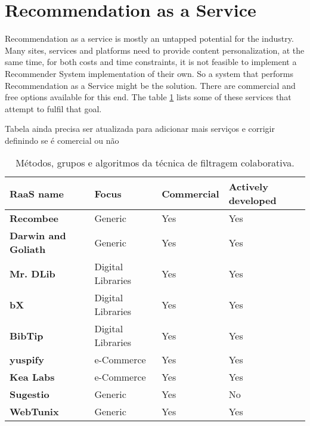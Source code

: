 \section{Recommendation as a Service}


Recommendation as a service is mostly an untapped potential for the industry. Many sites, services and platforms need to provide content personalization, at the same time, for both costs and time constraints, it is not feasible to implement a Recommender System implementation of their own. So a system that performs Recommendation as a Service might be the solution. There are commercial and free options available for this end.  The table \ref{tab:cf_methods} lists some of these services that attempt to fulfil that goal.  


Tabela ainda precisa ser atualizada para adicionar mais serviços e corrigir definindo se é comercial ou não

\begin{table}[hbt!]
\begin{tabular}{|l|l|l|l|}
\hline
\textbf{RaaS name}                             & \textbf{Focus}     & \textbf{Commercial}             & \textbf{Actively developed}                                    \\ \hline
\textbf{Recombee}                             & Generic             & Yes & Yes \\ \hline
\textbf{Darwin and Goliath}                             & Generic             & Yes & Yes \\ \hline
\textbf{Mr. DLib}                             & Digital Libraries             & Yes & Yes \\ \hline
\textbf{bX}                             & Digital Libraries             & Yes & Yes \\ \hline
\textbf{BibTip}                             & Digital Libraries             & Yes & Yes \\   \hline
\textbf{yuspify}                             & e-Commerce             & Yes & Yes \\   \hline
\textbf{Kea Labs}                             & e-Commerce             & Yes & Yes \\   \hline
\textbf{Sugestio}                             & Generic             & Yes & No \\   \hline
\textbf{WebTunix}                             & Generic             & Yes & Yes \\   \hline
\end{tabular}
\centering
\caption{Métodos, grupos e algoritmos da técnica de filtragem colaborativa.}
\label{tab:cf_methods}
\end{table}

